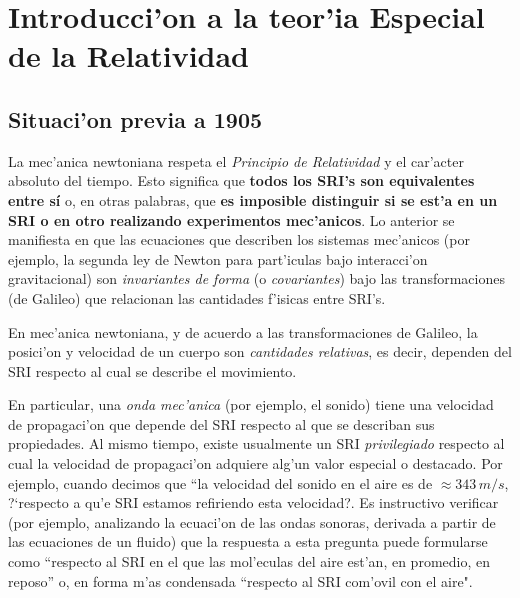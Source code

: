 \chapter{Introducci'on a la teor'ia Especial de la Relatividad}

\section{Situaci'on previa a 1905}

La mec'anica newtoniana respeta el \textit{Principio de Relatividad} y el car'acter absoluto del tiempo. Esto significa que \textbf{todos los SRI's son equivalentes entre s\'i} o, en otras palabras, que \textbf{es imposible distinguir si se est'a en un SRI o en otro realizando experimentos mec'anicos}.
Lo anterior se manifiesta en que las ecuaciones que describen los sistemas mec'anicos (por ejemplo, la segunda ley de Newton para part'iculas bajo interacci'on gravitacional) son \textit{invariantes de forma} (o \textit{covariantes}) bajo las transformaciones (de Galileo) que relacionan las cantidades f'isicas entre SRI's.

En mec'anica newtoniana, y de acuerdo a las transformaciones de Galileo, la
posici'on y velocidad de un cuerpo  son \textit{cantidades relativas}, es decir, dependen del SRI respecto al cual se describe el movimiento.

En particular, una \textit{onda mec'anica} (por ejemplo, el sonido) tiene una velocidad de propagaci'on que depende del SRI respecto al que se describan sus propiedades. Al mismo tiempo, existe usualmente un SRI \textit{privilegiado} respecto al cual la velocidad de propagaci'on adquiere alg'un valor especial o destacado.
Por ejemplo, cuando decimos que ``la velocidad del sonido en el aire es de $\approx 343\,m/s$, ?`respecto a qu'e SRI estamos refiriendo esta velocidad?. Es instructivo verificar (por ejemplo, analizando la ecuaci'on de las ondas sonoras, derivada a partir de las ecuaciones de un fluido) que la respuesta a esta pregunta puede formularse como ``respecto al SRI en el que las mol'eculas del aire est'an, en promedio, en reposo'' o, en forma m'as condensada ``respecto al SRI com'ovil con el aire".

